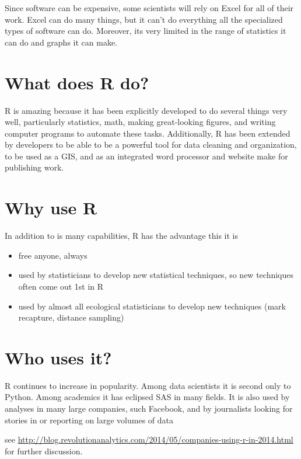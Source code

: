 \documentclass[
]{book}
\providecommand{\tightlist}{%
  \setlength{\itemsep}{0pt}\setlength{\parskip}{0pt}}
\begin{document}
Since software can be expensive, some scientists will rely on Excel for all of their work. Excel can do many things, but it can't do everything all the specialized types of software can do. Moreover, its very limited in the range of statistics it can do and graphs it can make.

\hypertarget{what-does-r-do}{%
\section{What does R do?}\label{what-does-r-do}}

R is amazing because it has been explicitly developed to do several things very well, particularly statistics, math, making great-looking figures, and writing computer programs to automate these tasks. Additionally, R has been extended by developers to be able to be a powerful tool for data cleaning and organization, to be used as a GIS, and as an integrated word processor and website make for publishing work.

\hypertarget{why-use-r}{%
\section{Why use R}\label{why-use-r}}

In addition to is many capabilities, R has the advantage this it is

\begin{itemize}
\tightlist
\item
  free anyone, always
\item
  used by statisticians to develop new statistical techniques, so new techniques often come out 1st in R
\item
  used by almost all ecological statisticians to develop new techniques (mark recapture, distance sampling)
\end{itemize}

\hypertarget{who-uses-it}{%
\section{Who uses it?}\label{who-uses-it}}

R continues to increase in popularity. Among data scientists it is second only to Python. Among academics it has eclipsed SAS in many fields. It is also used by analyses in many large companies, such Facebook, and by journalists looking for stories in or reporting on large volumes of data

see \url{http://blog.revolutionanalytics.com/2014/05/companies-using-r-in-2014.html} for further discussion.
\end{document}
